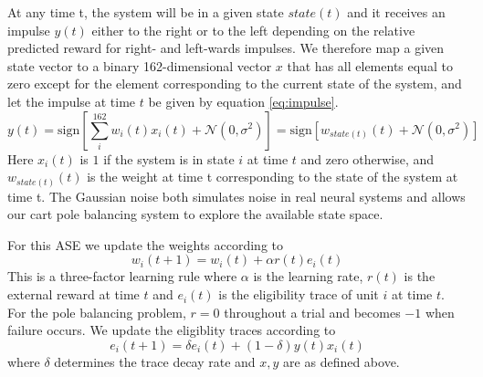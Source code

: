 \documentclass{article}
\begin{document}
At any time t, the system will be in a given state $state(t)$ and it receives an impulse $y(t)$ either to the right or to the left depending on the relative predicted reward for right- and left-wards impulses. We therefore map a given state vector to a binary 162-dimensional vector $x$ that has all elements equal to zero except for the element corresponding to the current state of the system, and let the impulse at time $t$ be given by equation \ref{eq:impulse}.
\begin{equation}\label{eq:impulse}
y(t) = \text{sign}[\sum_i^{162}{w_i(t)x_i(t)} + \mathcal{N}(0, \sigma^2)] = \text{sign}[w_{state(t)}(t) + \mathcal{N}(0, \sigma^2)] 
\end{equation}
Here $x_i(t)$ is $1$ if the system is in state $i$ at time $t$ and zero otherwise, and $w_{state(t)}(t)$ is the weight at time t corresponding to the state of the system at time t. The Gaussian noise both simulates noise in real neural systems and allows our cart pole balancing system to explore the available state space.

For this ASE we update the weights according to
\begin{equation}
w_i(t+1) = w_i(t) + \alpha r(t) e_i(t)
\end{equation}
This is a three-factor learning rule where $\alpha$ is the learning rate, $r(t)$ is the external reward at time $t$ and $e_i(t)$ is the eligibility trace of unit $i$ at time $t$. For the pole balancing problem, $r=0$ throughout a trial and becomes $-1$ when failure occurs. We update the eligiblity traces according to
\begin{equation}
e_i(t+1) = \delta e_i(t) + (1-\delta) y(t) x_i(t)
\end{equation}
where $\delta$ determines the trace decay rate and $x, y$ are as defined above.
\end{document}
